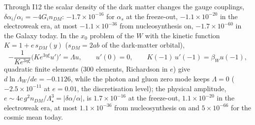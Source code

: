 \documentclass[
  10pt,
]{article}
\begin{document}
Through I12 the scalar density of the dark matter changes the gauge
couplings, \(\delta\alpha_i/\alpha_i = -4G_in_{DM}\):
\(-1.7\times10^{-16}\) for \(\alpha_s\) at the freeze-out,
\(-1.1\times10^{-20}\) in the electroweak era, at most
\(-1.1\times10^{-36}\) from nucleosynthesis on, \(-1.7\times10^{-60}\)
in the Galaxy today. In the \(x_0\) problem of the \(W\) with the
kinetic function \(K = 1 + e\,s_{DM}(y)\) (\(s_{DM} = 2ab\) of the
dark-matter orbital),
\[ -\frac{1}{Ke^{3\eta\xi}}\big(Ke^{3\eta\xi}u'\big)' = \Lambda u,\qquad u'(0) = 0,\qquad K(-1)\,u'(-1) = \beta_Wu(-1), \]
quadratic finite elements (300 elements, Richardson in \(e\)) give
\(d\ln\Lambda_W/de = -0.1126\), while the photon and gluon zero mode
keeps \(\Lambda = 0\) (\(-2.5\times10^{-11}\) at \(e = 0.01\), the
discretisation level); the physical amplitude,
\(e \sim 4c\,g^2n_{DM}/\Lambda_\star^3 = \lvert\delta\alpha/\alpha\rvert\),
is \(1.7\times10^{-16}\) at the freeze-out, \(1.1\times10^{-20}\) in the
electroweak era, at most \(1.1\times10^{-36}\) from nucleosynthesis on
and \(5\times10^{-66}\) for the cosmic mean today.
\end{document}
